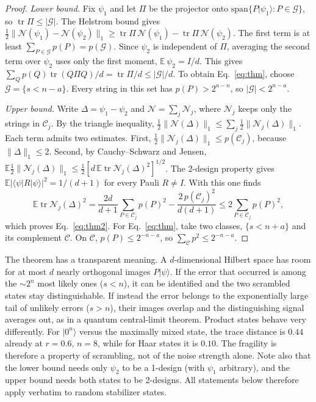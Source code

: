 \documentclass[aps,prl,twocolumn,superscriptaddress,amsmath,amssymb,10pt]{revtex4-2}
\newcommand{\E}{\mathbb{E}}
\newcommand{\N}{\mathcal{N}}
\newcommand{\tr}{\operatorname{tr}}
\begin{document}
\begin{proof}
\emph{Lower bound.} Fix $\psi_1$ and let $\Pi$ be the projector onto $\mathrm{span}\{P|\psi_1\rangle:P\in\mathcal G\}$, so $\tr\Pi\le|\mathcal G|$. The Helstrom bound gives $\tfrac12\|\N(\psi_1)-\N(\psi_2)\|_1\ge\tr\Pi\,\N(\psi_1)-\tr\Pi\,\N(\psi_2)$. The first term is at least $\sum_{P\in\mathcal G}p(P)=p(\mathcal G)$. Since $\psi_2$ is independent of $\Pi$, averaging the second term over $\psi_2$ uses only the first moment, $\E\,\psi_2=I/d$. This gives $\sum_Q p(Q)\tr(Q\Pi Q)/d=\tr\Pi/d\le|\mathcal G|/d$. To obtain Eq.~\eqref{eq:thm}, choose $\mathcal G=\{s<n-a\}$. Every string in this set has $p(P)>2^{a-n}$, so $|\mathcal G|<2^{n-a}$.

\emph{Upper bound.} Write $\Delta=\psi_1-\psi_2$ and $\N=\sum_j\N_j$, where $\N_j$ keeps only the strings in $\mathcal C_j$. By the triangle inequality, $\tfrac12\|\N(\Delta)\|_1\le\sum_j\tfrac12\|\N_j(\Delta)\|_1$. Each term admits two estimates. First, $\tfrac12\|\N_j(\Delta)\|_1\le p(\mathcal C_j)$, because $\|\Delta\|_1\le2$. Second, by Cauchy--Schwarz and Jensen, $\E\tfrac12\|\N_j(\Delta)\|_1\le\tfrac12[d\,\E\tr\N_j(\Delta)^2]^{1/2}$. The 2-design property gives $\E|\langle\psi|R|\psi\rangle|^2=1/(d+1)$ for every Pauli $R\neq I$. With this one finds
\begin{equation}
\E\tr\N_j(\Delta)^2=\frac{2d}{d+1}\sum_{P\in\mathcal C_j}p(P)^2-\frac{2\,p(\mathcal C_j)^2}{d(d+1)}\le 2\!\sum_{P\in\mathcal C_j}\!p(P)^2 ,
\end{equation}
which proves Eq.~\eqref{eq:thm2}. For Eq.~\eqref{eq:thm}, take two classes, $\{s<n+a\}$ and its complement $\mathcal C$. On $\mathcal C$, $p(P)\le 2^{-n-a}$, so $\sum_{\mathcal C}p^2\le2^{-n-a}$.
\end{proof}

The theorem has a transparent meaning. A $d$-dimensional Hilbert space has room for at most $d$ nearly orthogonal images $P|\psi\rangle$. If the error that occurred is among the $\sim\!2^{n}$ most likely ones ($s<n$), it can be identified and the two scrambled states stay distinguishable. If instead the error belongs to the exponentially large tail of unlikely errors ($s>n$), their images overlap and the distinguishing signal averages out, as in a quantum central-limit theorem. Product states behave very differently. For $|0^n\rangle$ versus the maximally mixed state, the trace distance is $0.44$ already at $r=0.6$, $n=8$, while for Haar states it is $0.10$. The fragility is therefore a property of scrambling, not of the noise strength alone. Note also that the lower bound needs only $\psi_2$ to be a 1-design (with $\psi_1$ arbitrary), and the upper bound needs both states to be 2-designs. All statements below therefore apply verbatim to random stabilizer states.
\end{document}
